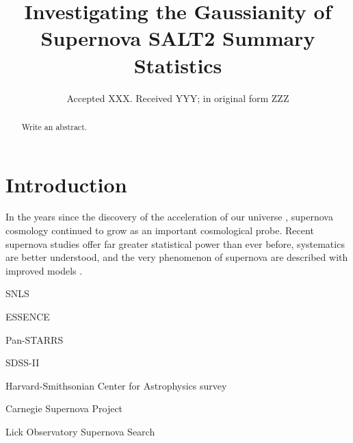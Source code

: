 \documentclass[a4paper,fleqn,usenatbib]{mnras}
\title[Supernova Gaussianity]{Investigating the Gaussianity of Supernova SALT2 Summary Statistics}
\author[S. R. Hinton et al.]{
Samuel R. Hinton,$^{1}$\thanks{E-mail: \href{samuelreay@gmail.com}}
Alex G. Kim,$^{3}$
Tamara M. Davis,$^{1,2}$
Edward Macaulay$^{1,2}$
\\
$^{1}$School of Mathematics and Physics, The University of Queensland, Brisbane, QLD 4072, Australia\\
$^{2}$ARC Centre of Excellence for All-sky Astrophysics (CAASTRO)\\
$^{3}$Physics Division, Lawrence Berkeley National Laboratory, 1 Cyclotron Road, Berkeley, CA 94720, USA
}
\date{Accepted XXX. Received YYY; in original form ZZZ}
\begin{document}
\label{firstpage}
\pagerange{\pageref{firstpage}--\pageref{lastpage}}
\maketitle

\begin{abstract}
Write an abstract.
\end{abstract}




\section{Introduction}


In the years since the discovery of the acceleration of our universe \citep{RiessFilippenko1998, SchmidtSuntzeff1998, PerlmutterAldering1999}, supernova cosmology continued to grow as an important cosmological probe. Recent supernova studies offer far greater statistical power than ever before, systematics are better understood, and the very phenomenon of supernova are described with improved models \citep{GuyAstier2007, ConleyGuy2011, BetouleKessler2014, RubinAldering2015}. 



\vspace{10mm}

SNLS \citep{AstierGuy2006, SullivanGuy2011}

ESSENCE \citep{WoodVaseyMiknaitis2007}

Pan-STARRS \citep{TonryStubbs2012, ScolnicRest2014, RestScolnic2014}

SDSS-II \citep{FriemanBassett2008, KesslerBecker2009, SollermanMortsell2009, LampeitlNichol2010, CampbellDAndrea2013}

Harvard-Smithsonian Center for Astrophysics survey \citep[CfA,][]{HickenChallis2009}

Carnegie Supernova Project \citep[CSP,][]{ContrerasHamuy2010, FolatelliPhillips2010, StritzingerPhillips2011}

Lick Observatory Supernova Search \citep[LOSS,][]{GaneshalingamLi2013}
	
\end{document}
